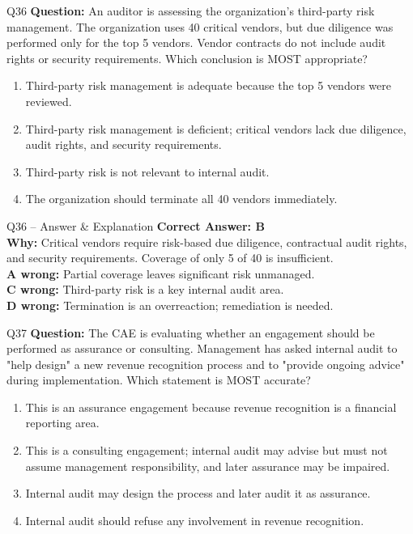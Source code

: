 \documentclass[aspectratio=169,10pt]{beamer}
\begin{document}
	\begin{frame}[t]{Q36}
		\small
		\textbf{Question:} An auditor is assessing the organization's third-party risk management. The organization uses 40 critical vendors, but due diligence was performed only for the top 5 vendors. Vendor contracts do not include audit rights or security requirements. Which conclusion is MOST appropriate?
		\begin{enumerate}[label=\Alph*.,itemsep=1pt,topsep=2pt]
			\item Third-party risk management is adequate because the top 5 vendors were reviewed.
			\item Third-party risk management is deficient; critical vendors lack due diligence, audit rights, and security requirements.
			\item Third-party risk is not relevant to internal audit.
			\item The organization should terminate all 40 vendors immediately.
		\end{enumerate}
	\end{frame}
	
	\begin{frame}[t]{Q36 -- Answer \& Explanation}
		\small
		\textbf{Correct Answer: B} \\[4pt]
		\textbf{Why:} Critical vendors require risk-based due diligence, contractual audit rights, and security requirements. Coverage of only 5 of 40 is insufficient. \\[4pt]
		\textbf{A wrong:} Partial coverage leaves significant risk unmanaged. \\[2pt]
		\textbf{C wrong:} Third-party risk is a key internal audit area. \\[2pt]
		\textbf{D wrong:} Termination is an overreaction; remediation is needed.
	\end{frame}
	
	\begin{frame}[t]{Q37}
		\small
		\textbf{Question:} The CAE is evaluating whether an engagement should be performed as assurance or consulting. Management has asked internal audit to "help design" a new revenue recognition process and to "provide ongoing advice" during implementation. Which statement is MOST accurate?
		\begin{enumerate}[label=\Alph*.,itemsep=1pt,topsep=2pt]
			\item This is an assurance engagement because revenue recognition is a financial reporting area.
			\item This is a consulting engagement; internal audit may advise but must not assume management responsibility, and later assurance may be impaired.
			\item Internal audit may design the process and later audit it as assurance.
			\item Internal audit should refuse any involvement in revenue recognition.
		\end{enumerate}
	\end{frame}
	
\end{document}
